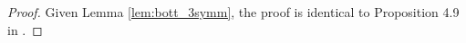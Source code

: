 \documentclass[edeposit,fullpage]{uiucthesis2009}
\newcommand{\mbb}{\mathbb}
\DeclareMathOperator{\iHom}{\mathbf{Hom}}
\theoremstyle{plain}
\newtheorem{lemma}{Lemma}
\numberwithin{lemma}{section}
\theoremstyle{definition}
\begin{document}
\begin{proof}
Given Lemma \ref{lem:bott_3symm}, the proof is identical to
Proposition 4.9 in \cite{cdhdesc}.
\end{proof}










\end{document}
